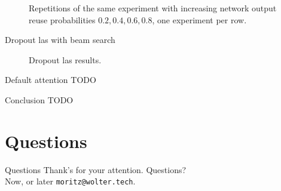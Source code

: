 \documentclass{beamer}
\begin{document}
\begin{frame}
	\begin{figure}
	\centering
	
	
	
	
	
	
	
	
	\caption{Repetitions of the same experiment with increasing network output reuse probabilities $0.2, 0.4, 0.6, 0.8$, one experiment per row.}
	\label{fig:lasGreedy2468}
	\end{figure}
\end{frame}

\begin{frame}{Dropout las with beam search}
	\begin{figure}
	
	
	\caption{Dropout las results.}
	\end{figure}
\end{frame}


\begin{frame}{Default attention}
TODO
\end{frame}

\begin{frame}{Conclusion}
TODO
\end{frame}


\section{Questions}
\begin{frame}{Questions}
	Thank's for your attention. Questions? \\
	Now, or later \texttt{moritz@wolter.tech}.
\end{frame}
\end{document}

